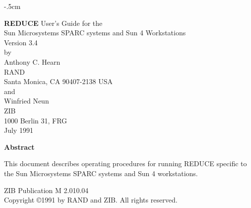 \hoffset -.5cm
\parindent 0pt
\parskip 6pt
\pagestyle{empty}
\setlength{\topsep}{0.5\baselineskip}  %
\setlength{\itemsep}{\topsep}
\setlength{\abovedisplayskip}{\topsep}  %
\setlength{\belowdisplayskip}{\topsep}

\renewcommand{\arraystretch}{1.3}
\renewcommand{\thechapter}{\arabic{chapter}}
\renewcommand{\thesection}{\arabic{section}.}
\renewcommand{\thesubsection}{\arabic{subsection}.}
\newcommand{\REDUCE}{REDUCE}


\newcommand{\system}{Sun Microsystems SPARC systems and Sun 4}
\newcommand{\programsize}{2.5}      %
\newcommand{\virtualsize}{128}      %
\newcommand{\timingmachine}{Sun 4/260}
\newcommand{\machinefactors}{SparcStation 1+&0.9
                          \\ SparcStation 2 &0.7
                          \\ SparcServer    &0.9
                          \\ Sun 4/110      &1.1
                          \\ Sun 4/65       &1.0}
\newcommand{\cartridgecommand}{tar xbf 126 /dev/rst0}
\newcommand{\tapespace}{8.8}        %
\newcommand{\createtime}{11}        %
\newcommand{\executablespace}{2.5}  %
\newcommand{\testtime}{5.5}         %
\newcommand{\floatingpointdigits}{12}


\vspace*{1cm}
\begin{center}
{\LARGE {\bf REDUCE} User's Guide  for the } \vspace*{2mm} \\
{\LARGE {\system} Workstations} \\
\vspace*{.5cm}
{\LARGE Version 3.4} \\[0.3cm]
{\large by} \\[0.3cm]
{\Large Anthony C. Hearn}\\
{\large RAND} \\
{\large Santa Monica, CA 90407-2138 USA} \\[0.3cm]
{\large and} \\[0.3cm]
{\Large Winfried Neun}\\
{\large ZIB} \\
{\large 1000 Berlin 31, FRG} \\[0.3cm]
{\large July 1991}\\[0.5cm]
\vfill

{\bf Abstract}
\end{center}
This document describes operating procedures for running {\REDUCE}
specific to the {\system} workstations.
\begin{center}
{ZIB  Publication M 2.010.04} \\
\vspace*{1cm}
Copyright \copyright 1991 by RAND and ZIB.  All rights reserved.
\end{center}

